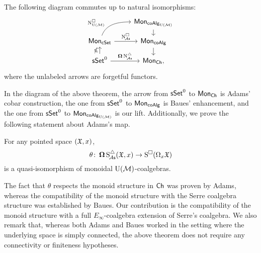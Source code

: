 \begin{theorem*}
	The following diagram commutes up to natural isomorphisms:
	\[
	\begin{tikzcd} [row sep=small]
		& \Mon_{\coAlg_\UM} \arrow[d] \\
		\Mon_{\cSet} \arrow[ru, "\cchainsUM", out=70, in=180, near start] \arrow[r, "\cchainsA"]
		& \Mon_{\coAlg} \arrow[d] \\
		\sSet^0 \arrow[r, "\cobar \schainsA"] \arrow[u, "\ccobar"]
		& \Mon_{\Ch},
	\end{tikzcd}
	\]
	where the unlabeled arrows are forgetful functors.
\end{theorem*}

In the diagram of the above theorem, the arrow from $\mathsf{sSet}^0$ to $\mathsf{Mon}_{\mathsf{Ch}}$ is Adams' cobar construction, the one from $\mathsf{sSet}^0$ to $\mathsf{Mon}_{\mathsf{coAlg}}$ is Baues' enhancement, and the one from $\mathsf{sSet}^0$ to $\mathsf{Mon}_{\mathsf{coAlg}_{{\operatorname{U}(\mathcal{M})}}}$ is our lift.
Additionally, we prove the following statement about Adams's map.


\begin{theorem*}
	For any pointed space $(\mathfrak{X}, x)$,
	\[
	\theta \colon \operatorname{\mathbf{\Omega}} \operatorname{S^{\triangle}_{\!{\mathcal{A}\mathsf{s}}}}(\mathfrak{X}, x) \to \operatorname{S^{\square}}(\Omega_x \mathfrak{X})
	\]
	is a quasi-isomorphism of monoidal ${\operatorname{U}(\mathcal{M})}$-coalgebras.
\end{theorem*}
 
The fact that $\theta$ respects the monoid structure in $\mathsf{Ch}$ was proven by Adams, whereas the compatibility of the monoid structure with the Serre coalgebra structure was established by Baues. 
Our contribution is the compatibility of the monoid structure with a full $E_\infty$-coalgebra extension of Serre's coalgebra.
We also remark that, whereas both Adams and Baues worked in the setting where the underlying space is simply connected, the above theorem does not require any connectivity or finiteness hypotheses. %


